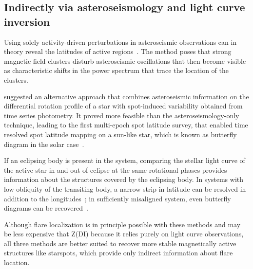 \documentclass[proof]{WileyASNA-v1}
\begin{document}
\subsection{Indirectly via asteroseismology and light curve inversion}

Using solely activity-driven perturbations in asteroseismic observations can in theory reveal the latitudes of active regions~\citep{gizon2002, papini2015, papini2019}. The method poses that strong magnetic field clusters disturb asteroseismic oscillations that then become visible as characteristic shifts in the power spectrum that trace the location of the clusters.

\citep{berdyugina2005} suggested an alternative approach that combines asteroseismic information on the differential rotation profile of a star with spot-induced variability obtained from time series photometry. It proved more feasible than the asteroseismology-only technique, leading to the first multi-epoch spot latitude survey, that enabled time resolved spot latitude mapping on a sun-like star, which is known as butterfly diagram in the solar case~\citep{benomar2018, bazot2018}.

If an eclipsing body is present in the system, comparing the stellar light curve of the active star in and out of eclipse at the same rotational phases provides information about the structures covered by the eclipsing body. In systems with low obliquity of the transiting body, a narrow strip in latitude can be resolved in addition to the longitudes~\citep{huber2009,huber2010}; in sufficiently misaligned system, even butterfly diagrams can be recovered~\citep{netto2020}. 

Although flare localization is in principle possible with these methods and may be less expensive that Z(DI) because it relies purely on light curve observations, all three methods are better suited to recover more stable magnetically active structures like starspots, which provide only indirect information about flare location.
\end{document}
